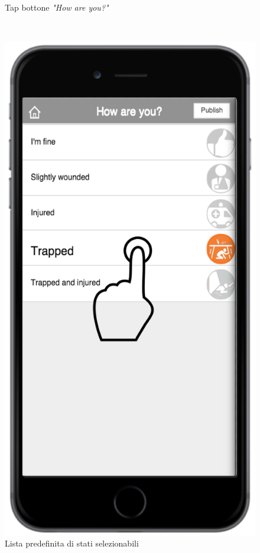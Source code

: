 \begin{figure}
\begin{minipage}[b]{6cm}
	\caption{Tap bottone \textit{"How are you?"}}
	\label{fig:buttoncomestai}
 \end{minipage}
 \ \hspace{6 mm} \hspace{7 mm} \
 \begin{minipage}[b]{6cm}
  \centering
\includegraphics[scale=0.6]{interfaccia/comestaitap.png}
	\caption{Lista predefinita di stati selezionabili}
	\label{fig:lista}
 \end{minipage}
\end{figure}

